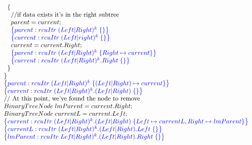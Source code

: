 \[\begin{array}{@{}l@{}}
        \;\;\;\;\{\\
            \;\;\;\;\;\;\text{//if data exists it's in the right subtree}\\
            \;\;\;\;\;\;parent = current; \\
            \;\;\;\;\;\;\specline{parent:rcuItr\; (Left|Right)^{k} \; \{ \} }\\
            \;\;\;\;\;\;\specline{current:rcuItr\; (Left|right)^{k} \; \{ \} }\\
            \;\;\;\;\;\;current = current.Right; \\
            \;\;\;\;\;\;\specline{parent:rcuItr\; (Left|Right)^{k} \; \{ Right\mapsto current\} }\\
            \;\;\;\;\;\;\specline{current:rcuItr\; (Left|Right)^{k}.Right \; \{ \} }\\
        \;\;\;\;\}\\
    \;\;\} \\
    \;\;\specline{parent:rcuItr\; (Left|Right)^{k} \; \{(Left|Right)\mapsto current\} }\\
    \;\;\specline{current:rcuItr\; (Left|Right)^{k}.(Left|Right) \; \{ \} }\\
    \;\;\text{// At this point, we've found the node to remove}\\
    \;\;BinaryTreeNode \;lmParent = current.Right;\\
    \;\;BinaryTreeNode \;currentL = current.Left;\\
    \;\;\specline{current:rcuItr\; (Left|Right)^{k}.(Left|Right) \; \{ Left \mapsto currentL, Right \mapsto lmParent\} }\\
    \;\;\specline{currentL:rcuItr\; (Left|Right)^{k}.(Left|Right).Left \; \{\} }\\
     \;\;\specline{lmParent:rcuItr\; Left|Right)^{k}.(Left|Right).Right \; \{ \} }\\
    
\end{array}
\]

